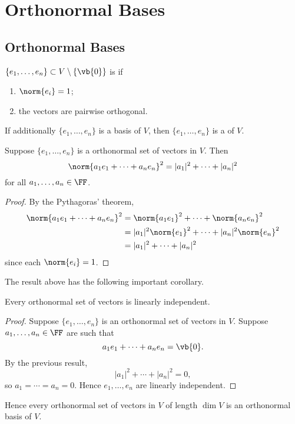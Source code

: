 \section{Orthonormal Bases}
\subsection{Orthonormal Bases}
\begin{definition}
$\{e_1,\dots,e_n\}\subset V\setminus\{\vb{0}\}$ is  if
\begin{enumerate}[label=(\roman*)]
\item $\norm{e_i}=1$;
\item the vectors are pairwise orthogonal.
\end{enumerate}
If additionally $\{e_1,\dots,e_n\}$ is a basis of $V$, then $\{e_1,\dots,e_n\}$ is a  of $V$.
\end{definition}

\begin{lemma}
Suppose $\{e_1,\dots,e_n\}$ is a orthonormal set of vectors in $V$. Then
\[\norm{a_1e_1+\cdots+a_ne_n}^2=|a_1|^2+\cdots+|a_n|^2\]
for all $a_1,\dots,a_n\in\FF$.
\end{lemma}

\begin{proof}
By the Pythagoras' theorem,
\begin{align*}
\norm{a_1e_1+\cdots+a_ne_n}^2
&=\norm{a_1e_1}^2+\cdots+\norm{a_ne_n}^2\\
&=|a_1|^2\norm{e_1}^2+\cdots+|a_n|^2\norm{e_n}^2\\
&=|a_1|^2+\cdots+|a_n|^2
\end{align*}
since each $\norm{e_i}=1$.
\end{proof}

The result above has the following important corollary.

\begin{corollary}
Every orthonormal set of vectors is linearly independent.
\end{corollary}

\begin{proof}
Suppose $\{e_1,\dots,e_n\}$ is an orthonormal set of vectors in $V$. Suppose $a_1,\dots,a_n\in\FF$ are such that
\[a_1e_1+\cdots+a_ne_n=\vb{0}.\]
By the previous result,
\[|a_1|^2+\cdots+|a_n|^2=0,\]
so $a_1=\cdots=a_n=0$. Hence $e_1,\dots,e_n$ are linearly independent.
\end{proof}

Hence every orthonormal set of vectors in $V$ of length $\dim V$ is an orthonormal basis of $V$.

